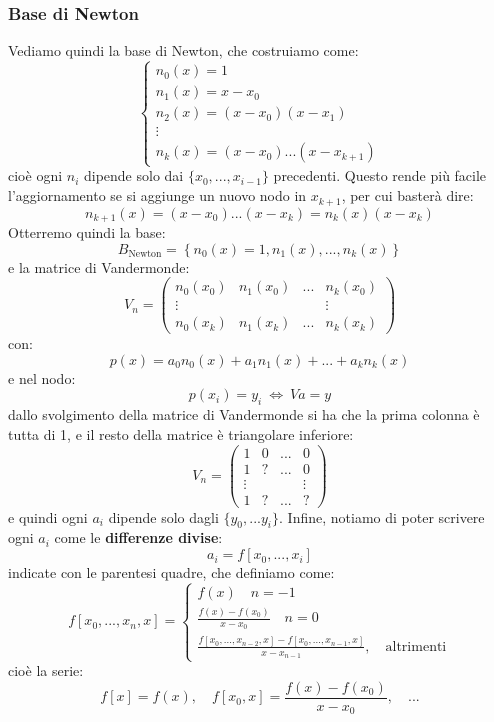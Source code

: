 \documentclass[a4paper,11pt]{article}
\begin{document}
\subsubsection{Base di Newton}
Vediamo quindi la base di Newton, che costruiamo come:
\[
	\begin{cases}
			n_0(x) = 1 \\
			n_1(x) = x - x_0 \\
			n_2(x) = (x - x_0)(x - x_1) \\
			\vdots \\
			n_k(x) = (x - x_0) ... (x - x_{k + 1})
	\end{cases}
\]
cioè ogni $n_i$ dipende solo dai $\{ x_0, ..., x_{i - 1} \}$ precedenti.
Questo rende più facile l'aggiornamento se si aggiunge un nuovo nodo in $x_{k + 1}$, per cui basterà dire:
$$
n_{k + 1}(x) = (x - x_0) ... (x - x_k) = n_k(x) (x - x_k)
$$
Otterremo quindi la base:
$$
B_\text{Newton} = \left\{ n_0(x) = 1, n_1(x), ..., n_k(x) \right\}
$$
e la matrice di Vandermonde:
$$
V_n =
\begin{pmatrix}
	n_0(x_0) & n_1(x_0) & ... & n_k(x_0) \\ 
	\vdots & & & \vdots \\
	n_0(x_k) & n_1(x_k) & ... & n_k(x_k)
\end{pmatrix}
$$
con:
$$
p(x) = a_0 n_0(x) + a_1 n_1(x) + ... + a_k n_k(x)
$$
e nel nodo:
$$
p(x_i) = y_i \ \Leftrightarrow \ Va = y
$$
dallo svolgimento della matrice di Vandermonde si ha che la prima colonna è tutta di 1, e il resto della matrice è triangolare inferiore:
$$
V_n =
\begin{pmatrix}
	1 & 0 & ... & 0 \\
	1 & ? & ... & 0 \\
	\vdots & & & \vdots \\
	1 & ? & ... & ?
\end{pmatrix}
$$
e quindi ogni $a_i$ dipende solo dagli $\{ y_0, ... y_i \}$.
Infine, notiamo di poter scrivere ogni $a_i$ come le \textbf{differenze divise}:
$$
a_i = f[x_0, ..., x_i]
$$
indicate con le parentesi quadre, che definiamo come:
$$
f[x_0, ..., x_n, x] =
\begin{cases}
	f(x) \quad n = - 1 \\
	\frac{f(x) - f(x_0)}{x - x_0} \quad n = 0 \\
	\frac{ f[x_0, ..., x_{n - 2}, x] - f[x_0, ..., x_{n-1}, x] }{x - x_{n - 1}}, \quad \text{altrimenti}
\end{cases}
$$
cioè la serie:
$$
f[x] = f(x), \quad f[x_0, x] = \frac{f(x) - f(x_0)}{x - x_0}, \quad ...
$$
\end{document}
